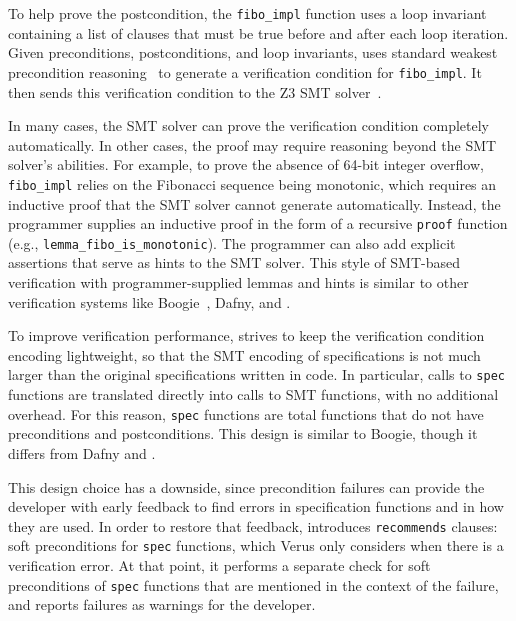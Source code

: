 To help prove the postcondition,
the \verb`fibo_impl` function uses a loop invariant 
containing a list of clauses that must be true before and after each loop iteration.
Given preconditions, postconditions, and loop invariants,
\verus uses standard weakest precondition reasoning~\cite{DBLP:journals/cacm/Dijkstra75}
to generate a verification condition for \verb`fibo_impl`.
It then sends this verification condition to the Z3 SMT solver~\cite{z3}.

In many cases, the SMT solver can prove the verification condition completely automatically.
In other cases, the proof may require reasoning beyond the SMT solver's abilities.
For example, to prove the absence of 64-bit integer overflow,
\verb`fibo_impl` relies on the Fibonacci sequence being monotonic,
which requires an inductive proof that the SMT solver cannot generate automatically.
Instead, the programmer supplies an inductive proof in the form of a recursive \verb`proof` function
(e.g., \verb`lemma_fibo_is_monotonic`).
The programmer can also add explicit assertions that
serve as hints to the SMT solver.
This style of SMT-based verification with programmer-supplied lemmas and hints
is similar to other verification systems like Boogie~\cite{boogie}, Dafny, and \fstar.

To improve verification performance,
\verus strives to keep the verification condition encoding lightweight,
so that the SMT encoding of specifications is not much larger than the original
specifications written in \verus code.
In particular, calls to \verb`spec` functions are translated directly into calls to SMT functions,
with no additional overhead.
For this reason, \verus \verb`spec` functions are total functions that do not have preconditions and postconditions.
This design is similar to Boogie,
though it differs from Dafny and \fstar.

This design choice has a downside, since
precondition failures can provide the developer with early feedback
to find errors in specification functions and in how they are used.
In order to restore that feedback, \verus introduces \verb`recommends` clauses: soft preconditions
for \verb`spec` functions, which Verus only considers when there is a verification error.
At that point, it performs a separate check for soft preconditions of
\verb`spec` functions that are mentioned in the context of the failure,
and reports failures as warnings for the developer.

